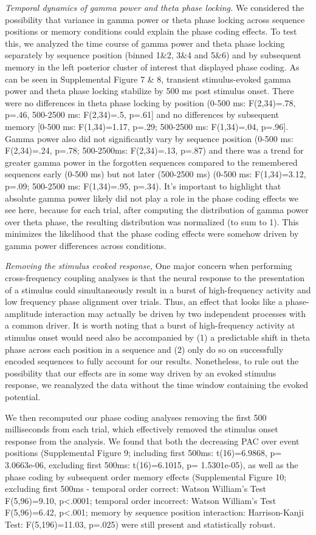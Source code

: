 \emph{Temporal dynamics of gamma power and theta phase locking.} We
considered the possibility that variance in gamma power or theta phase
locking across sequence positions or memory conditions could explain the
phase coding effects. To test this, we analyzed the time course of gamma
power and theta phase locking separately by sequence position (binned
1\&2, 3\&4 and 5\&6) and by subsequent memory in the left posterior
cluster of interest that displayed phase coding. As can be seen in
Supplemental Figure 7 \& 8, transient stimulus-evoked gamma power and
theta phase locking stabilize by 500 ms post stimulus onset. There were
no differences in theta phase locking by position (0-500 ms:
F(2,34)=.78, p=.46, 500-2500 ms: F(2,34)=.5, p=.61{]} and no differences
by subsequent memory {[}0-500 ms: F(1,34)=1.17, p=.29; 500-2500 ms:
F(1,34)=.04, p=.96{]}. Gamma power also did not significantly vary by
sequence position (0-500 ms: F(2,34)=.24, p=.78; 500-2500ms:
F(2,34)=.13, p=.87) and there was a trend for greater gamma power in the
forgotten sequences compared to the remembered sequences early (0-500
ms) but not later (500-2500 ms) (0-500 ms: F(1,34)=3.12, p=.09; 500-2500
ms: F(1,34)=.95, p=.34). It's important to highlight that absolute gamma
power likely did not play a role in the phase coding effects we see
here, because for each trial, after computing the distribution of gamma
power over theta phase, the resulting distribution was normalized (to
sum to 1). This minimizes the likelihood that the phase coding effects
were somehow driven by gamma power differences across conditions.

\emph{Removing the stimulus evoked response,} One major concern when
performing cross-frequency coupling analyses is that the neural response
to the presentation of a stimulus could simultaneously result in a burst
of high-frequency activity and low frequency phase alignment over
trials. Thus, an effect that looks like a phase-amplitude interaction
may actually be driven by two independent processes with a common
driver. It is worth noting that a burst of high-frequency activity at
stimulus onset would need also be accompanied by (1) a predictable shift
in theta phase across each position in a sequence and (2) only do so on
successfully encoded sequences to fully account for our results.
Nonetheless, to rule out the possibility that our effects are in some
way driven by an evoked stimulus response, we reanalyzed the data
without the time window containing the evoked potential.

We then recomputed our phase coding analyses removing the first 500
milliseconds from each trial, which effectively removed the stimulus
onset response from the analysis. We found that both the decreasing PAC
over event positions (Supplemental Figure 9; including first 500ms:
t(16)=6.9868, p= 3.0663e-06, excluding first 500ms: t(16)=6.1015, p=
1.5301e-05), as well as the phase coding by subsequent order memory
effects (Supplemental Figure 10; excluding first 500ms - temporal order
correct: Watson William's Test F(5,96)=9.10, p\textless{}.0001; temporal
order incorrect: Watson William's Test F(5,96)=6.42, p\textless{}.001;
memory by sequence position interaction: Harrison-Kanji Test:
F(5,196)=11.03, p=.025) were still present and statistically robust.

